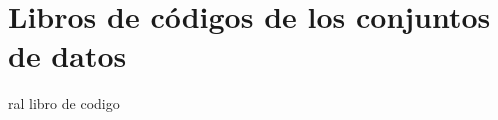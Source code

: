 \section{Libros de códigos de los conjuntos de datos}
\label{an:librocodigo}

ral libro de codigo
\label{an:Bral}

